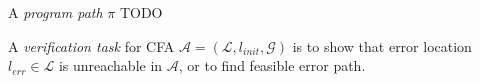 A \emph{program path} $\pi$ TODO

A \emph{verification task} for  CFA $\mathcal{A} = (\mathcal{L},
l_{\textit{init}}, \mathcal{G})$ is to show that error location
$l_{\textit{err}} \in \mathcal{L}$ is unreachable in $\mathcal{A}$, or to find
feasible error path.

